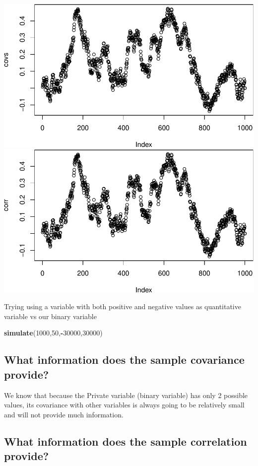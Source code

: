 \documentclass[]{article}
\newenvironment{Shaded}{\begin{snugshade}}{\end{snugshade}}
\newcommand{\DecValTok}[1]{\textcolor[rgb]{0.00,0.00,0.81}{#1}}
\newcommand{\KeywordTok}[1]{\textcolor[rgb]{0.13,0.29,0.53}{\textbf{#1}}}
\newcommand{\NormalTok}[1]{#1}
\newcommand{\OperatorTok}[1]{\textcolor[rgb]{0.81,0.36,0.00}{\textbf{#1}}}
\begin{document}
\includegraphics{./figures/unnamed-chunk-11-1.pdf}
\includegraphics{./figures/unnamed-chunk-11-2.pdf}

Trying using a variable with both positive and negative values as
quantitative variable vs our binary variable

\begin{Shaded}
\begin{Highlighting}[]
\KeywordTok{simulate}\NormalTok{(}\DecValTok{1000}\NormalTok{,}\DecValTok{50}\NormalTok{,}\OperatorTok{-}\DecValTok{30000}\NormalTok{,}\DecValTok{30000}\NormalTok{)}
\end{Highlighting}
\end{Shaded}

\hypertarget{what-information-does-the-sample-covariance-provide}{%
\subsection{What information does the sample covariance
provide?}\label{what-information-does-the-sample-covariance-provide}}

We know that because the Private variable (binary variable) has only 2
possible values, its covariance with other variables is always going to
be relatively small and will not provide much information.

\newpage

\hypertarget{what-information-does-the-sample-correlation-provide}{%
\subsection{What information does the sample correlation
provide?}\label{what-information-does-the-sample-correlation-provide}}
\end{document}
